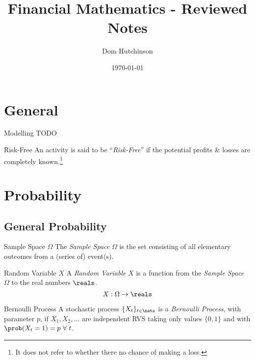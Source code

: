 \documentclass[11pt,a4paper]{article}
\begin{document}
\title{Financial Mathematics - Reviewed Notes}
\author{Dom Hutchinson}
\date{\today}
\maketitle

\tableofcontents\newpage

\section{General}\label{sec_general}

  \begin{definition}{Modelling}
    TODO
  \end{definition}

  \begin{definition}{Risk-Free}
    An activity is said to be ``\textit{Risk-Free}'' if the potential profits \& losses are completely known.\footnote{It does not refer to whether there no chance of making a loss.}
  \end{definition}

\section{Probability}\label{sec_probability}

\subsection{General Probability}

  \begin{definition}{Sample Space $\Omega$}
    The \textit{Sample Space} $\Omega$ is the set consisting of all elementary outcomes from a (series of) event(s).
  \end{definition}

  \begin{definition}{Random Variable $X$}
    A \textit{Random Variable} $X$ is a function from the \textit{Sample Space} $\Omega$ to the real numbers $\reals$.
    \[ X:\Omega\to\reals \]
  \end{definition}

  \begin{definition}{Bernoulli Process}
    A stochastic process $\{X_t\}_{t\in\nats}$ is a \textit{Bernoulli Process}, with parameter $p$, if $X_1,X_2,\dots$ are independent RVS taking only values $\{0,1\}$ and with $\prob(X_t=1)=p\ \forall\ t$.
  \end{definition}
\end{document}
